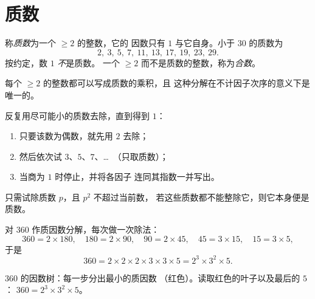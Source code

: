 \section{质数}

\begin{definition}[质数]\label{def:g9:arith:prime}
称\emph{质数}为一个 $\geq 2$ 的整数，它的
因数只有 $1$ 与它自身。小于 $30$ 的质数为
\[
2,\ 3,\ 5,\ 7,\ 11,\ 13,\ 17,\ 19,\ 23,\ 29 .
\]
按约定，数 $1$ \emph{不}是质数。
一个 $\geq 2$ 而不是质数的整数，称为\emph{合数}。
\end{definition}

\begin{theorem}[质因数分解]\label{thm:g9:arith:factorization}
每个 $\geq 2$ 的整数都可以写成质数的乘积，且
这种分解在不计因子次序的意义下是唯一的。
\end{theorem}
\admitted

\begin{method}[整数的质因数分解]\label{met:g9:arith:factorization}
反复用尽可能小的质数去除，直到得到 $1$：
\begin{enumerate}
  \item 只要该数为偶数，就先用 $2$ 去除；
  \item 然后依次试 $3$、$5$、$7$、\dots\ （只取质数）；
  \item 当商为 $1$ 时停止，并将各因子
        连同其指数一并写出。
\end{enumerate}
只需试除质数 $p$，且 $p^2$ 不超过当前数，
若这些质数都不能整除它，则它本身便是质数。
\end{method}

\begin{example}\label{ex:g9:arith:factorization}
对 $360$ 作质因数分解，每次做一次除法：
\[
360 = 2 \times 180, \quad
180 = 2 \times 90, \quad
90 = 2 \times 45, \quad
45 = 3 \times 15, \quad
15 = 3 \times 5,
\]
于是
\[
360 = 2 \times 2 \times 2 \times 3 \times 3 \times 5 = 2^3 \times 3^2
\times 5 .
\]
\end{example}

\begin{omfigure}

{\small $360$ 的因数树：每一步分出最小的质因数
（红色）。读取红色的叶子以及最后的 $5$：
$360 = 2^3 \times 3^2 \times 5$。}
\end{omfigure}

